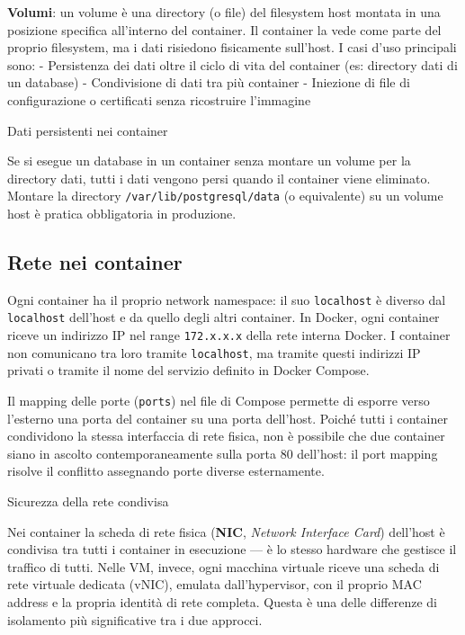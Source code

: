 \documentclass[
  italian,
  openany]{book}
\begin{document}
\textbf{Volumi}: un volume è una directory (o file) del filesystem host
montata in una posizione specifica all'interno del container. Il
container la vede come parte del proprio filesystem, ma i dati risiedono
fisicamente sull'host. I casi d'uso principali sono: - Persistenza dei
dati oltre il ciclo di vita del container (es: directory dati di un
database) - Condivisione di dati tra più container - Iniezione di file
di configurazione o certificati senza ricostruire l'immagine

\begin{calloutwarning}{Dati persistenti nei container}

Se si esegue un database in un container senza montare un volume per la
directory dati, tutti i dati vengono persi quando il container viene
eliminato. Montare la directory \texttt{/var/lib/postgresql/data} (o
equivalente) su un volume host è pratica obbligatoria in produzione.

\end{calloutwarning}

\subsection{Rete nei container}\label{rete-nei-container}

Ogni container ha il proprio network namespace: il suo
\texttt{localhost} è diverso dal \texttt{localhost} dell'host e da
quello degli altri container. In Docker, ogni container riceve un
indirizzo IP nel range \texttt{172.x.x.x} della rete interna Docker. I
container non comunicano tra loro tramite \texttt{localhost}, ma tramite
questi indirizzi IP privati o tramite il nome del servizio definito in
Docker Compose.

Il mapping delle porte (\texttt{ports}) nel file di Compose permette di
esporre verso l'esterno una porta del container su una porta dell'host.
Poiché tutti i container condividono la stessa interfaccia di rete
fisica, non è possibile che due container siano in ascolto
contemporaneamente sulla porta 80 dell'host: il port mapping risolve il
conflitto assegnando porte diverse esternamente.

\begin{calloutnote}{Sicurezza della rete condivisa}

Nei container la scheda di rete fisica (\textbf{NIC}, \emph{Network
Interface Card}) dell'host è condivisa tra tutti i container in
esecuzione --- è lo stesso hardware che gestisce il traffico di tutti.
Nelle VM, invece, ogni macchina virtuale riceve una scheda di rete
virtuale dedicata (vNIC), emulata dall'hypervisor, con il proprio MAC
address e la propria identità di rete completa. Questa è una delle
differenze di isolamento più significative tra i due approcci.

\end{calloutnote}
\end{document}
